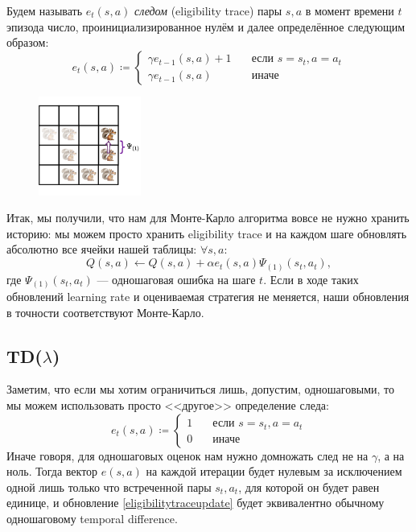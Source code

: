 \begin{definition}
Будем называть $e_t(s, a)$ \emph{следом} (eligibility trace) пары $s, a$ в момент времени $t$ эпизода число, проинициализированное нулём и далее определённое следующим образом:
$$e_t(s, a) \coloneqq \begin{cases}
\gamma e_{t - 1}(s, a) + 1 \quad & \text{если } s = s_t, a = a_t \\
\gamma e_{t - 1}(s, a) \quad & \text{иначе}
\end{cases}$$
\end{definition}

\begin{figure}
\vspace{-0.8cm}
\centering
\includegraphics[width=0.3\textwidth]{Images/EligibilityTrace.png}
\vspace{-0.6cm}
\end{figure}

Итак, мы получили, что нам для Монте-Карло алгоритма вовсе не нужно хранить историю: мы можем просто хранить eligibility trace и на каждом шаге обновлять абсолютно все ячейки нашей таблицы: $\forall s, a \colon$
\begin{equation}\label{eligibilitytraceupdate}
    Q(s, a) \leftarrow Q(s, a) + \alpha e_t(s, a) \Psi_{(1)}(s_t, a_t),
\end{equation}
где $\Psi_{(1)}(s_t, a_t)$ --- одношаговая ошибка на шаге $t$. Если в ходе таких обновлений learning rate и оцениваемая стратегия не меняется, наши обновления в точности соответствуют Монте-Карло.

\subsection{TD($\lambda$)}

Заметим, что если мы хотим ограничиться лишь, допустим, одношаговыми, то мы можем использовать просто <<другое>> определение следа:
$$e_t(s, a) \coloneqq \begin{cases}
1 \quad & \text{если } s = s_t, a = a_t \\
0 \quad & \text{иначе}
\end{cases}$$
Иначе говоря, для одношаговых оценок нам нужно домножать след не на $\gamma$, а на ноль. Тогда вектор $e(s, a)$ на каждой итерации будет нулевым за исключением одной лишь только что встреченной пары $s_t, a_t$, для которой он будет равен единице, и обновление \ref{eligibilitytraceupdate} будет эквивалентно обычному одношаговому temporal difference.


